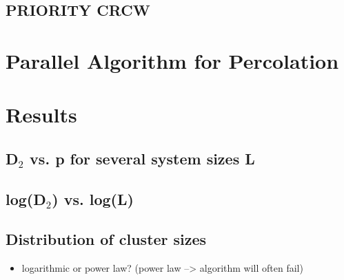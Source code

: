 \documentclass{umthesis}
\begin{document}
\subsection{PRIORITY CRCW}
\label{sec-4.3.2}
\section{Parallel Algorithm for Percolation}
\label{sec-4.4}
\section{Results}
\label{sec-4.5}
\subsection{D$_2$ vs. p for several system sizes L}
\label{sec-4.5.1}
\subsection{log(D$_2$) vs. log(L)}
\label{sec-4.5.2}
\subsection{Distribution of cluster sizes}
\label{sec-4.5.3}
\begin{itemize}

\item logarithmic or power law? (power law --> algorithm will often fail)\\
\label{sec-4.5.3.1}%



 
\end{itemize} %
\end{document}
